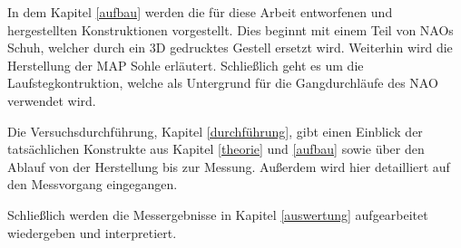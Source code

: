 In dem Kapitel \ref{aufbau} werden die für diese Arbeit entworfenen und hergestellten Konstruktionen vorgestellt. Dies beginnt mit einem Teil von NAOs Schuh, welcher durch ein 3D gedrucktes Gestell ersetzt wird. Weiterhin wird die Herstellung der MAP Sohle erläutert. Schließlich geht es um die Laufstegkontruktion, welche als Untergrund für die Gangdurchläufe des NAO verwendet wird. 

Die Versuchsdurchführung, Kapitel \ref{durchführung}, gibt einen Einblick der tatsächlichen Konstrukte aus Kapitel \ref{theorie} und \ref{aufbau} sowie über den Ablauf von der Herstellung bis zur Messung. Außerdem wird hier detailliert auf den Messvorgang eingegangen. 

Schließlich werden die Messergebnisse in Kapitel \ref{auswertung} aufgearbeitet wiedergeben und interpretiert. 



